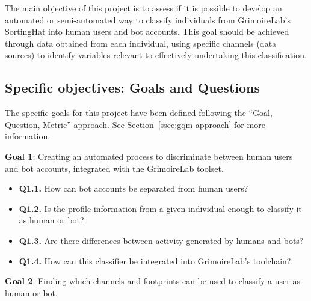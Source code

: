 \documentclass[a4paper, 12pt]{book}
\begin{document}
The main objective of this project is to assess if it is possible to develop an automated or semi-automated way to classify individuals from GrimoireLab’s SortingHat into human users and bot accounts. This goal should be achieved through data obtained from each individual, using specific channels (data sources) to identify variables relevant to effectively undertaking this classification.

\subsection{Specific objectives: Goals and Questions}
\label{ssec:specific-objectives}
The specific goals for this project have been defined following the ``Goal, Question, Metric'' approach. See Section~\ref{ssec:gqm-approach} for more information.



\textbf{Goal 1}: Creating an automated process to discriminate between human users and bot accounts, integrated with the GrimoireLab toolset.

\begin{itemize}
    \item \textbf{Q1.1.} How can bot accounts be separated from human users?
    \item \textbf{Q1.2.} Is the profile information from a given individual enough to classify it as human or bot?
    \item \textbf{Q1.3.} Are there differences between activity generated by humans and bots?
    \item \textbf{Q1.4.} How can this classifier be integrated into GrimoireLab’s toolchain?
\end{itemize}

\textbf{Goal 2}: Finding which channels and footprints can be used to classify a user as human or bot.
\end{document}
